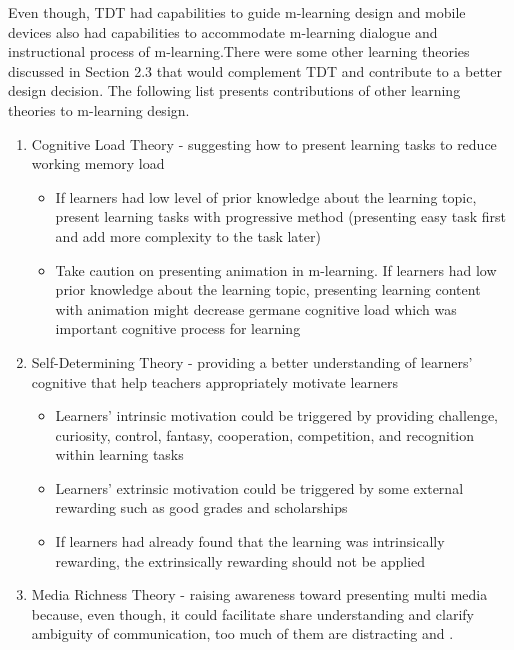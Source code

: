 Even though, TDT had capabilities to guide m-learning design and mobile devices also had capabilities to accommodate m-learning dialogue and instructional process of m-learning.There were some other learning theories discussed in Section 2.3 that would complement TDT and contribute to a better design decision. The following list presents contributions of other learning theories to m-learning design. 

\begin{enumerate} 
\item Cognitive Load Theory - suggesting how to present learning tasks to reduce working memory load \cite{sweller1998cognitive}
\begin{itemize}
\item If learners had low level of prior knowledge about the learning topic, present learning tasks with progressive method (presenting easy task first and add more complexity to the task later) \cite{clarke2005impact}
\item Take caution on presenting animation in m-learning. If learners had low prior knowledge about the learning topic, presenting learning content with animation might decrease germane cognitive load which was important cognitive process for learning \cite{schnotz2005enabling}
\end{itemize} 
\item Self-Determining Theory - providing a better understanding of learners' cognitive that help teachers appropriately motivate learners \cite{ryan2000intrinsic}
\begin{itemize} 
\item Learners' intrinsic motivation could be triggered by providing challenge, curiosity, control, fantasy, cooperation, competition, and recognition within learning tasks \cite{malone1987making}
\item Learners' extrinsic motivation could be triggered by some external rewarding such as good grades and scholarships \cite{ryan2000intrinsic}
\item If learners had already found that the learning was intrinsically rewarding, the extrinsically rewarding should not be applied \cite{rosenfield1980rewards} 
\end{itemize} 
\item Media Richness Theory - raising awareness toward presenting multi media because, even though, it could facilitate share understanding and clarify ambiguity of communication, too much of them are distracting \cite{daft1983information} and \cite{sun2007design}. 

\end{enumerate}
